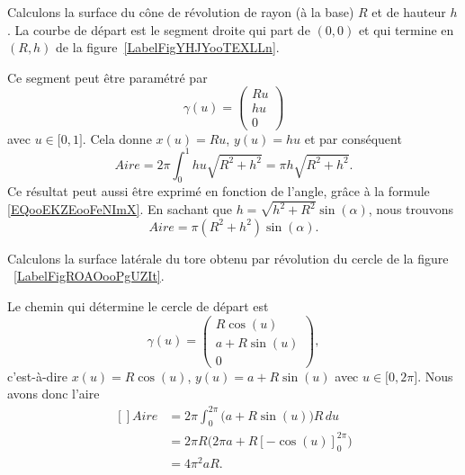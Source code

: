 \begin{example}     \label{EXooZCLXooVmXQgY}
	Calculons la surface du cône de révolution de rayon (à la base) $R$ et de hauteur $h$. La courbe de départ est le segment droite qui part de $(0,0)$ et qui termine en $(R,h)$ de la figure~\ref{LabelFigYHJYooTEXLLn}. %
	\newcommand{\CaptionFigYHJYooTEXLLn}{En faisant tourner cette droite autour de l'axe $X$, nous obtenons un cône.}
	

	Ce segment peut être paramétré par
	\begin{equation}
		\gamma(u)=\begin{pmatrix}
			Ru \\
			hu \\
			0
		\end{pmatrix}
	\end{equation}
	avec $u\in\mathopen[ 0 , 1 \mathclose]$. Cela donne $x(u)=Ru$, $y(u)=hu$ et par conséquent
	\begin{equation}
		Aire=2\pi\int_0^1hu\sqrt{R^2+h^2}=\pi h\sqrt{R^2+h^2}.
	\end{equation}
	Ce résultat peut aussi être exprimé en fonction de l'angle, grâce à la formule \eqref{EQooEKZEooFeNImX}. En sachant que $h=\sqrt{h^2+R^2}\sin(\alpha)$, nous trouvons
	\begin{equation}
		Aire=\pi(R^2+h^2)\sin(\alpha).
	\end{equation}

\end{example}

\begin{example}
	Calculons la surface latérale du tore obtenu par révolution du cercle de la figure ~\ref{LabelFigROAOooPgUZIt}. %
	\newcommand{\CaptionFigROAOooPgUZIt}{Si nous tournons ce cercle autour de l'axe $X$, nous obtenons un tore de rayon «externe» $a$ et de rayon «interne» $R$.}
	

	Le chemin qui détermine le cercle de départ est
	\begin{equation}
		\gamma(u)=\begin{pmatrix}
			R\cos(u)   \\
			a+R\sin(u) \\
			0
		\end{pmatrix},
	\end{equation}
	c'est-à-dire $x(u)=R\cos(u)$, $y(u)=a+R\sin(u)$ avec $u\in\mathopen[ 0 , 2\pi \mathclose]$. Nous avons donc l'aire
	\begin{equation}
		\begin{aligned}[]
			Aire & =2\pi\int_0^{2\pi}\big( a+R\sin(u) \big)R\,du  \\
			     & =2\pi R\big( 2\pi a+R[-\cos(u)]_0^{2\pi} \big) \\
			     & =4\pi^2aR.
		\end{aligned}
	\end{equation}
\end{example}

